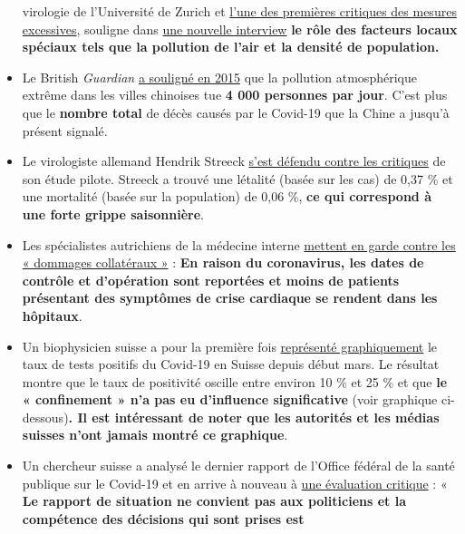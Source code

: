 \begin{itemize}
  virologie de l'Université de Zurich et
  \href{https://www.rubikon.news/artikel/die-stimme-der-vernunft}{l'une
  des premières critiques des mesures excessives}, souligne dans
  \href{https://www.youtube.com/watch?v=4rl2sqLcDoQ}{une nouvelle
  interview} \textbf{le rôle des facteurs locaux spéciaux tels que la
  pollution de l'air et la densité de population.}
\item
  Le British \emph{Guardian}
  \href{https://www.theguardian.com/world/2015/aug/14/air-pollution-in-china-is-killing-4000-people-every-day-a-new-study-finds}{a
  souligné en 2015} que la pollution atmosphérique extrême dans les
  villes chinoises tue \textbf{4 000 personnes par jour}. C'est plus que
  le \textbf{nombre total} de décès causés par le Covid-19 que la Chine
  a jusqu'à présent signalé.
\item
  Le virologiste allemand Hendrik Streeck
  \href{https://www.tagesspiegel.de/wissen/virologe-streeck-zur-coronavirus-studie-die-veroeffentlichung-zu-heinsberg-war-nicht-leichtfertig/25735672.html}{s'est
  défendu contre les critiques} de son étude pilote. Streeck a trouvé
  une létalité (basée sur les cas) de 0,37 \% et une mortalité (basée
  sur la population) de 0,06 \%, \textbf{ce qui correspond à une forte
  grippe saisonnière}.
\item
  Les spécialistes autrichiens de la médecine interne
  \href{https://wien.orf.at/stories/3044064}{mettent en garde contre les
  « dommages collatéraux »} : \textbf{En raison du coronavirus, les
  dates de contrôle et d'opération sont reportées et moins de patients
  présentant des symptômes de crise cardiaque se rendent dans les
  hôpitaux}.
\item
  Un biophysicien suisse a pour la première fois
  \href{https://swprs.org/rate-of-positive-covid19-tests/}{représenté
  graphiquement} le taux de tests positifs du Covid-19 en Suisse depuis
  début mars. Le résultat montre que le taux de positivité oscille entre
  environ 10 \% et 25 \% et que \textbf{le « confinement » n'a pas eu
  d'influence significative} (voir graphique ci-dessous)\textbf{. Il est
  intéressant de noter que les autorités et les médias suisses n'ont
  jamais montré ce graphique}.
\item
  Un chercheur suisse a analysé le dernier rapport de l'Office fédéral
  de la santé publique sur le Covid-19 et en arrive à nouveau à
  \href{https://covid-19-fakten.blogspot.com/2020/04/der-bag-situationsbericht-vom-1442020.html}{une
  évaluation critique} : « \textbf{Le rapport de situation ne convient
  pas aux politiciens et la compétence des décisions qui sont prises est
}
\end{itemize}
